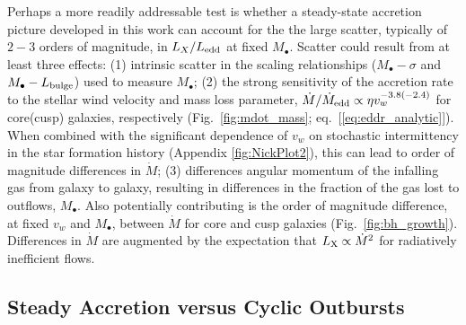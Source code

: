 \documentclass[usenatbib,fleqn]{mn2e}
\newcommand{\Mbh}[1][]{M_{\bullet#1}}
\begin{document}

  Perhaps a more readily addressable test is whether a steady-state
  accretion picture developed in this work can account for the the
  large scatter, typically of $2-3$ orders of magnitude, in
  $L_{X}/L_{\rm edd}$ at fixed $M_{\bullet}$.  Scatter could result
  from at least three effects: (1) intrinsic scatter in the scaling
  relationships ($\Mbh-\sigma$ and $\Mbh-L_{\rm bulge}$) used to
  measure $\Mbh$; (2) the strong sensitivity of the accretion rate to
  the stellar wind velocity and mass loss parameter,
  $\dot{M}/\dot{M}_{\rm edd} \propto \eta v_{w}^{-3.8(-2.4)}$ for
  core(cusp) galaxies, respectively (Fig.~\ref{fig:mdot_mass};
  eq.~[\ref{eq:eddr_analytic}]).  When combined with the significant
  dependence of $v_w$ on stochastic intermittency in the star
  formation history (Appendix \ref{fig:NickPlot2}), this can lead to
  order of magnitude differences in $\dot{M}$; (3) differences angular
  momentum of the infalling gas from galaxy to galaxy, resulting in
  differences in the fraction of the gas lost to outflows, $\Mbh$.
  Also potentially contributing is the order of magnitude difference,
  at fixed $v_w$ and $M_{\bullet}$, between $\dot{M}$ for core and
  cusp galaxies (Fig.~\ref{fig:bh_growth}).  Differences in $\dot{M}$
  are augmented by the expectation that $L_{\rm X} \propto \dot{M}^{2}
  $ for radiatively inefficient flows.





\subsection{Steady Accretion versus Cyclic Outbursts}
\label{sec:cycle}
\end{document}
